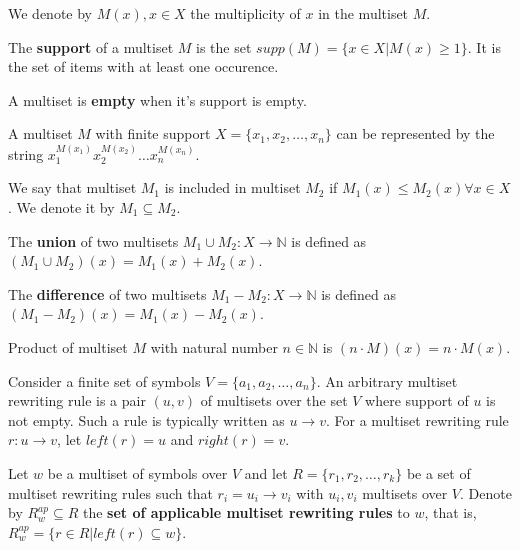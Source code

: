 \documentclass[a4paper,10pt]{article}
\begin{document}
\begin{definicia}
  We denote by $M(x), x\in X$ the multiplicity of $x$ in the multiset $M$.
\end{definicia}

\begin{definicia}
  The {\bf support} of a multiset $M$ is the set $supp(M)=\{x\in X|M(x)\geq 1\}$. It is the set of items with at least one occurence.
\end{definicia}

\begin{definicia}
  A multiset is {\bf empty} when it's support is empty.
\end{definicia}

A multiset $M$ with finite support $X = \{x_1, x_2, \dots, x_n\}$ can be represented by the string $x_1^{M(x_1)}x_2^{M(x_2)}\dots x_n^{M(x_n)}$.

\begin{definicia}
  We say that multiset $M_1$ is included in multiset $M_2$ if $M_1(x)\leq M_2(x)\forall x \in X$. We denote it by $M_1\subseteq M_2$.
\end{definicia}

\begin{definicia}
  The {\bf union} of two multisets $M_1\cup M_2 : X\rightarrow \mathbb N$ is defined as $(M_1\cup M_2)(x)=M_1(x)+M_2(x)$.
\end{definicia}

\begin{definicia}
  The {\bf difference} of two multisets $M_1-M_2 : X\rightarrow \mathbb N$ is defined as $(M_1-M_2)(x)=M_1(x)-M_2(x)$.
\end{definicia}

\begin{definicia}
  Product of multiset $M$ with natural number $n\in \mathbb N$ is $(n\cdot M)(x)=n\cdot M(x)$.
\end{definicia}

\begin{definicia}
  Consider a finite set of symbols $V=\{a_1, a_2,\dots, a_n\}$. An arbitrary multiset rewriting rule is a pair $(u, v)$ of multisets over the set $V$ where support of $u$ is not empty. Such a rule is typically written as $u\rightarrow v$. For a multiset rewriting rule $r : u\rightarrow v$, let $left(r) = u$ and $right(r) = v$.
\end{definicia}

\begin{definicia}
  Let $w$ be a multiset of symbols over $V$ and let $R=\{r_1, r_2,\dots, r_k\}$ be a set of multiset rewriting rules such that $r_i = u_i\rightarrow v_i$ with $u_i, v_i$ multisets over $V$. Denote by $R^{ap}_w\subseteq R$ the {\bf set of applicable multiset rewriting rules} to $w$, that is, $R^{ap}_w = \{r\in R|left(r)\subseteq w\}$.
\end{definicia}
\end{document}
